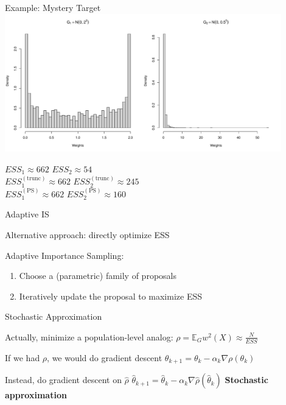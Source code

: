 \documentclass[14pt]{beamer}
\newcommand{\bE}{\mathbb{E}}
\begin{document}
\begin{frame}{Example: Mystery Target}
    \centering
    \includegraphics[height=0.5\textheight, width=0.9\textwidth]{Figures/Wt Hist - Pareto Smooth.pdf}\newline
    \begin{outline}
        $ESS_1 \approx 662$ \hspace{2.5cm} $ESS_2 \approx 54$\\
        $ESS_1^{(\mathrm{trunc})} \approx 662$ \hspace{2.5cm} $ESS_2^{(\mathrm{trunc})} \approx 245$\\
        $ESS_1^{(\mathrm{PS})} \approx 662$ \hspace{2.5cm} $ESS_2^{(\mathrm{PS})} \approx 160$
    \end{outline}
\end{frame}


\begin{frame}{Adaptive IS}
    \begin{outline}
        \1 Alternative approach: directly optimize ESS \newline

        \1 Adaptive Importance Sampling: 
            \2 \citep{Aky21} \newline
    \end{outline}

    \begin{enumerate}
        [default]
        \item Choose a (parametric) family of proposals
        \item Iteratively update the proposal to maximize ESS
    \end{enumerate}
\end{frame}

\begin{frame}{Stochastic Approximation}
    \begin{outline}
        \1 Actually, minimize a population-level analog: 
            \2 $\rho = \bE_G w^2(X) \approx \frac{N}{ESS}$ \newline

        \1 If we had $\rho$, we would do gradient descent
            \2 $\theta_{k+1} = \theta_k - \alpha_k \nabla \rho(\theta_k)$ \newline

        \1 Instead, do gradient descent on $\hat{\rho}$
            \2 $\hat{\theta}_{k+1} = \hat{\theta}_k - \alpha_k \nabla \hat{\rho}(\hat{\theta}_k)$ 
        \1 \textbf{Stochastic approximation}
    \end{outline}
\end{frame}
\end{document}
